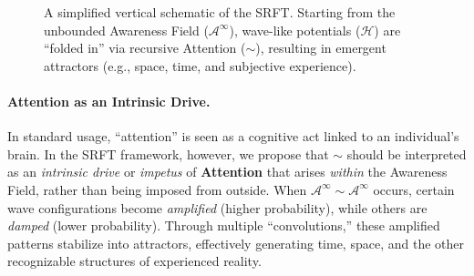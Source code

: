 \documentclass[12pt,a4paper]{article}
\begin{document}
\begin{figure}[ht]
\centering
{}
\caption{A simplified vertical schematic of the SRFT. 
Starting from the unbounded Awareness Field ($\mathscr{A}^\infty$), wave-like potentials ($\mathcal{H}$) 
are ``folded in'' via recursive Attention (\(\sim\)), resulting in emergent attractors 
(e.g., space, time, and subjective experience).}
\label{fig:seed-SRFT-schematic}
\end{figure}

\paragraph{Attention as an Intrinsic Drive.}
In standard usage, “attention” is seen as a cognitive act linked to an individual’s brain. 
In the SRFT framework, however, we propose that \(\sim\) should be interpreted as an \emph{intrinsic drive} 
or \emph{impetus} of \textbf{Attention} that arises \emph{within} the Awareness Field, rather than being imposed from outside. 
When \(\mathscr{A}^\infty \sim \mathscr{A}^\infty\) occurs, certain wave configurations become \emph{amplified} 
(higher probability), while others are \emph{damped} (lower probability). Through multiple “convolutions,” 
these amplified patterns stabilize into attractors, effectively generating time, space, and the other 
recognizable structures of experienced reality.
\end{document}
